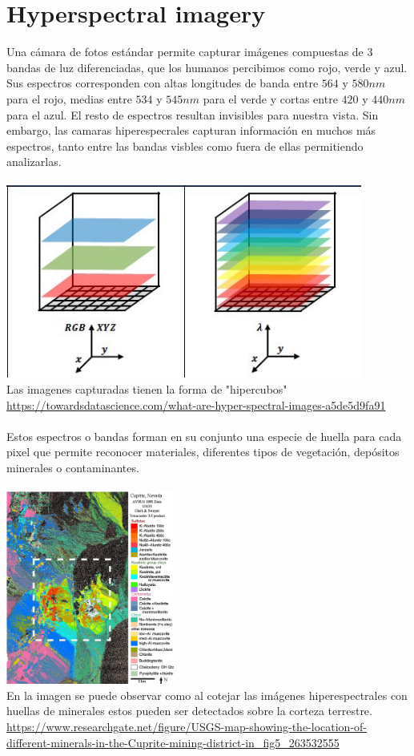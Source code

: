 \section{Hyperspectral imagery}
Una cámara de fotos estándar permite capturar imágenes compuestas de 3  bandas de luz diferenciadas, que los humanos percibimos como rojo, verde y azul. Sus espectros corresponden con altas longitudes de banda entre $564$ y $580 nm$ para el rojo, medias  entre $534$ y $545 nm$ para el verde y cortas entre $420$ y $440 nm$ para el azul. El resto de espectros resultan invisibles para nuestra vista.
Sin embargo, las camaras hiperespecrales capturan información en muchos más espectros, tanto entre las bandas visbles como fuera de ellas permitiendo analizarlas.
\\
\\
\includegraphics[height=2.5in]{figures/rgb_vs_hsi.jpeg}
\\
Las imagenes capturadas tienen la forma de "hipercubos"
\\
\url{https://towardsdatascience.com/what-are-hyper-spectral-images-a5de5d9fa91}
\\
\\
Estos espectros o bandas forman en su conjunto una especie de huella para cada pixel que permite reconocer materiales, diferentes tipos de vegetación, depósitos minerales o contaminantes.
\\
\\
\includegraphics[height=2.5in]{figures/cuprite.png}
\\
En la imagen se puede observar como al cotejar las imágenes hiperespectrales con huellas de minerales estos pueden ser detectados sobre la corteza terrestre.
\\
\url{https://www.researchgate.net/figure/USGS-map-showing-the-location-of-different-minerals-in-the-Cuprite-mining-district-in_fig5_263532555}

